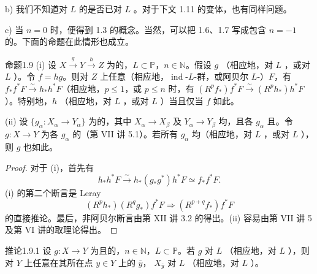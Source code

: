 b) 我们不知道对 $L$ 的是否已对 $L$ 。对于下文 1.11 的变体，也有同样问题。

c) 当 $n=0$ 时，便得到 1.3 的概念。当然，可以把 1.6、1.7 写成包含 $n=-1$ 的。下面的命题在此情形也成立。
\begin{SGAresult}{命题}{1.9}
(i) 设 $X\xrightarrow{g}Y\xrightarrow{h}Z$ 为的，$L\subset\mathbb P$，$n\in\mathbb N$。假设 $g$ （相应地，对 $L$ ，或对 $L$ ）。令 $f=hg$。则对 $Z$ 上任意（相应地，$\operatorname{ind}$-$L$-群，或阿贝尔 $L$-）$F$，有 $f_*f^*F\xrightarrow{\sim}h_*h^*F$（相应地，$p\leq1$，或 $p\leq n$ 时，有 $(R^pf_*)f^*F\xrightarrow{\sim}(R^ph_*)h^*F$）。特别地，$h$ （相应地，对 $L$ ，或对 $L$ ）当且仅当 $f$ 如此。

(ii) 设 $\{g_\alpha:X_\alpha\to Y_\alpha\}$ 为的，其中 $X_\alpha\to X_\beta$ 及 $Y_\alpha\to Y_\beta$ 均，且各 $g_\alpha$ 且。令 $g:X\to Y$ 为各 $g_\alpha$ 的（第 VII 讲 5.1）。若所有 $g_\alpha$ 均（相应地，对 $L$ ，或对 $L$ ），则 $g$ 也如此。
\end{SGAresult}
\begin{proof}
对于 (i)，首先有
\[h_*h^*F\xrightarrow{\sim}h_*(g_*g^*)h^*F\simeq f_*f^*F.\]
(i) 的第二个断言是 Leray 
\[(R^ph_*)(R^qg_*)f^*F\Longrightarrow(R^{p+q}f_*)f^*F\]
的直接推论。最后，非阿贝尔断言由第 XII 讲 3.2 的得出。(ii) 容易由第 VII 讲 5 及第 VI 讲的取理论得出。
\end{proof}
\begin{SGAresult}{推论}{1.9.1}
设 $g:X\to Y$ 为且的，$n\in\mathbb N$，$L\subset\mathbb P$。若 $g$ 对 $L$ （相应地，对 $L$ ），则对 $Y$ 上任意在其所在点 $y\in Y$ 上的 $\bar y$， $X_{\bar y}$ 对 $L$ （相应地，对 $L$ ）。
\end{SGAresult}
